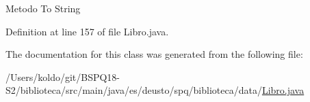 Metodo To String 

Definition at line 157 of file Libro.\+java.



The documentation for this class was generated from the following file\+:\begin{DoxyCompactItemize}
\item 
/\+Users/koldo/git/\+B\+S\+P\+Q18-\/\+S2/biblioteca/src/main/java/es/deusto/spq/biblioteca/data/\mbox{\hyperlink{_libro_8java}{Libro.\+java}}\end{DoxyCompactItemize}
